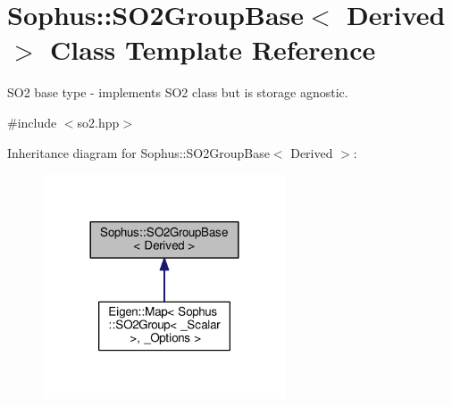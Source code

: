 \hypertarget{class_sophus_1_1_s_o2_group_base}{}\section{Sophus\+:\+:S\+O2\+Group\+Base$<$ Derived $>$ Class Template Reference}
\label{class_sophus_1_1_s_o2_group_base}


S\+O2 base type -\/ implements S\+O2 class but is storage agnostic.  




{\ttfamily \#include $<$so2.\+hpp$>$}



Inheritance diagram for Sophus\+:\+:S\+O2\+Group\+Base$<$ Derived $>$\+:
\nopagebreak
\begin{figure}[H]
\begin{center}
\leavevmode
\includegraphics[width=204pt]{class_sophus_1_1_s_o2_group_base__inherit__graph}
\end{center}
\end{figure}
